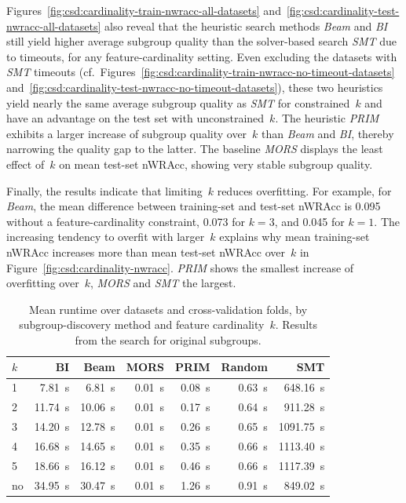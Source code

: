 \documentclass{article}
\theoremstyle{definition}
\begin{document}
Figures~\ref{fig:csd:cardinality-train-nwracc-all-datasets} and~\ref{fig:csd:cardinality-test-nwracc-all-datasets} also reveal that the heuristic search methods \emph{Beam} and \emph{BI} still yield higher average subgroup quality than the solver-based search \emph{SMT} due to timeouts, for any feature-cardinality setting.
Even excluding the datasets with \emph{SMT} timeouts (cf.~Figures~\ref{fig:csd:cardinality-train-nwracc-no-timeout-datasets} and~\ref{fig:csd:cardinality-test-nwracc-no-timeout-datasets}), these two heuristics yield nearly the same average subgroup quality as \emph{SMT} for constrained~$k$ and have an advantage on the test set with unconstrained~$k$.
The heuristic \emph{PRIM} exhibits a larger increase of subgroup quality over~$k$ than \emph{Beam} and \emph{BI}, thereby narrowing the quality gap to the latter.
The baseline \emph{MORS} displays the least effect of~$k$ on mean test-set nWRAcc, showing very stable subgroup quality.

Finally, the results indicate that limiting~$k$ reduces overfitting.
For example, for \emph{Beam}, the mean difference between training-set and test-set nWRAcc is 0.095 without a feature-cardinality constraint, 0.073 for $k=3$, and 0.045 for $k=1$.
The increasing tendency to overfit with larger~$k$ explains why mean training-set nWRAcc increases more than mean test-set nWRAcc over~$k$ in Figure~\ref{fig:csd:cardinality-nwracc}.
\emph{PRIM} shows the smallest increase of overfitting over~$k$, \emph{MORS} and \emph{SMT} the largest.

\begin{table}[t]
	\centering
	\begin{tabular}{lrrrrrr}
		\toprule
		$k$ & BI & Beam & MORS & PRIM & Random & SMT \\
		\midrule
		1 & 7.81~s & 6.81~s & 0.01~s & 0.08~s & 0.63~s & 648.16~s \\
		2 & 11.74~s & 10.06~s & 0.01~s & 0.17~s & 0.64~s & 911.28~s \\
		3 & 14.20~s & 12.78~s & 0.01~s & 0.26~s & 0.65~s & 1091.75~s \\
		4 & 16.68~s & 14.65~s & 0.01~s & 0.35~s & 0.66~s & 1113.40~s \\
		5 & 18.66~s & 16.12~s & 0.01~s & 0.46~s & 0.66~s & 1117.39~s \\
		no & 34.95~s & 30.47~s & 0.01~s & 1.26~s & 0.91~s & 849.02~s \\
		\bottomrule
	\end{tabular}
	\caption{
		Mean runtime over datasets and cross-validation folds, by subgroup-discovery method and feature cardinality~$k$.
		Results from the search for original subgroups.
	}
	\label{tab:csd:cardinality-runtime}
\end{table}
\end{document}
